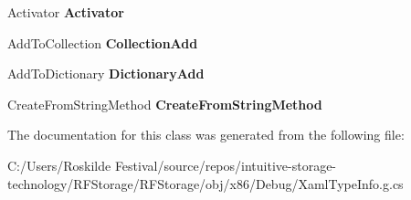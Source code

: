 \begin{DoxyCompactItemize}
\item 
\mbox{\label{class_r_f_storage_1_1_r_f_storage___xaml_type_info_1_1_xaml_user_type_aa7607d5098d0a641d0ec26acfe385063}} 
Activator {\bfseries Activator}
\item 
\mbox{\label{class_r_f_storage_1_1_r_f_storage___xaml_type_info_1_1_xaml_user_type_a76510aafdd5d63f545aab66c10292ef5}} 
Add\+To\+Collection {\bfseries Collection\+Add}
\item 
\mbox{\label{class_r_f_storage_1_1_r_f_storage___xaml_type_info_1_1_xaml_user_type_afdae89afa00220f90cab890ae51f8f13}} 
Add\+To\+Dictionary {\bfseries Dictionary\+Add}
\item 
\mbox{\label{class_r_f_storage_1_1_r_f_storage___xaml_type_info_1_1_xaml_user_type_af66661e67cd09b0d90bbef10f8926ae2}} 
Create\+From\+String\+Method {\bfseries Create\+From\+String\+Method}
\end{DoxyCompactItemize}


The documentation for this class was generated from the following file\+:\begin{DoxyCompactItemize}
\item 
C\+:/\+Users/\+Roskilde Festival/source/repos/intuitive-\/storage-\/technology/\+R\+F\+Storage/\+R\+F\+Storage/obj/x86/\+Debug/Xaml\+Type\+Info.\+g.\+cs\end{DoxyCompactItemize}
